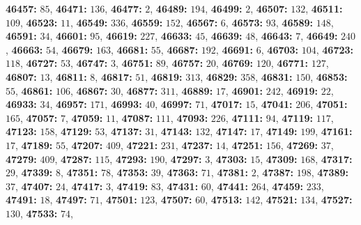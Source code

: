 \textsf{\bfseries 46457:} $85$, \textsf{\bfseries 46471:} $136$, \textsf{\bfseries 46477:} $2$, \textsf{\bfseries 46489:} $194$, \textsf{\bfseries 46499:} $2$, \textsf{\bfseries 46507:} $132$, \textsf{\bfseries 46511:} $109$, \textsf{\bfseries 46523:} $11$, \textsf{\bfseries 46549:} $336$, \textsf{\bfseries 46559:} $152$, \textsf{\bfseries 46567:} $6$, \textsf{\bfseries 46573:} $93$, \textsf{\bfseries 46589:} $148$, \textsf{\bfseries 46591:} $34$, \textsf{\bfseries 46601:} $95$, \textsf{\bfseries 46619:} $227$, \textsf{\bfseries 46633:} $45$, \textsf{\bfseries 46639:} $48$, \textsf{\bfseries 46643:} $7$, \textsf{\bfseries 46649:} $240$, \textsf{\bfseries 46663:} $54$, \textsf{\bfseries 46679:} $163$, \textsf{\bfseries 46681:} $55$, \textsf{\bfseries 46687:} $192$, \textsf{\bfseries 46691:} $6$, \textsf{\bfseries 46703:} $104$, \textsf{\bfseries 46723:} $118$, \textsf{\bfseries 46727:} $53$, \textsf{\bfseries 46747:} $3$, \textsf{\bfseries 46751:} $89$, \textsf{\bfseries 46757:} $20$, \textsf{\bfseries 46769:} $120$, \textsf{\bfseries 46771:} $127$, \textsf{\bfseries 46807:} $13$, \textsf{\bfseries 46811:} $8$, \textsf{\bfseries 46817:} $51$, \textsf{\bfseries 46819:} $313$, \textsf{\bfseries 46829:} $358$, \textsf{\bfseries 46831:} $150$, \textsf{\bfseries 46853:} $55$, \textsf{\bfseries 46861:} $106$, \textsf{\bfseries 46867:} $30$, \textsf{\bfseries 46877:} $311$, \textsf{\bfseries 46889:} $17$, \textsf{\bfseries 46901:} $242$, \textsf{\bfseries 46919:} $22$, \textsf{\bfseries 46933:} $34$, \textsf{\bfseries 46957:} $171$, \textsf{\bfseries 46993:} $40$, \textsf{\bfseries 46997:} $71$, \textsf{\bfseries 47017:} $15$, \textsf{\bfseries 47041:} $206$, \textsf{\bfseries 47051:} $165$, \textsf{\bfseries 47057:} $7$, \textsf{\bfseries 47059:} $11$, \textsf{\bfseries 47087:} $111$, \textsf{\bfseries 47093:} $226$, \textsf{\bfseries 47111:} $94$, \textsf{\bfseries 47119:} $117$, \textsf{\bfseries 47123:} $158$, \textsf{\bfseries 47129:} $53$, \textsf{\bfseries 47137:} $31$, \textsf{\bfseries 47143:} $132$, \textsf{\bfseries 47147:} $17$, \textsf{\bfseries 47149:} $199$, \textsf{\bfseries 47161:} $17$, \textsf{\bfseries 47189:} $55$, \textsf{\bfseries 47207:} $409$, \textsf{\bfseries 47221:} $231$, \textsf{\bfseries 47237:} $14$, \textsf{\bfseries 47251:} $156$, \textsf{\bfseries 47269:} $37$, \textsf{\bfseries 47279:} $409$, \textsf{\bfseries 47287:} $115$, \textsf{\bfseries 47293:} $190$, \textsf{\bfseries 47297:} $3$, \textsf{\bfseries 47303:} $15$, \textsf{\bfseries 47309:} $168$, \textsf{\bfseries 47317:} $29$, \textsf{\bfseries 47339:} $8$, \textsf{\bfseries 47351:} $78$, \textsf{\bfseries 47353:} $39$, \textsf{\bfseries 47363:} $71$, \textsf{\bfseries 47381:} $2$, \textsf{\bfseries 47387:} $198$, \textsf{\bfseries 47389:} $37$, \textsf{\bfseries 47407:} $24$, \textsf{\bfseries 47417:} $3$, \textsf{\bfseries 47419:} $83$, \textsf{\bfseries 47431:} $60$, \textsf{\bfseries 47441:} $264$, \textsf{\bfseries 47459:} $233$, \textsf{\bfseries 47491:} $18$, \textsf{\bfseries 47497:} $71$, \textsf{\bfseries 47501:} $123$, \textsf{\bfseries 47507:} $60$, \textsf{\bfseries 47513:} $142$, \textsf{\bfseries 47521:} $134$, \textsf{\bfseries 47527:} $130$, \textsf{\bfseries 47533:} $74$, 
